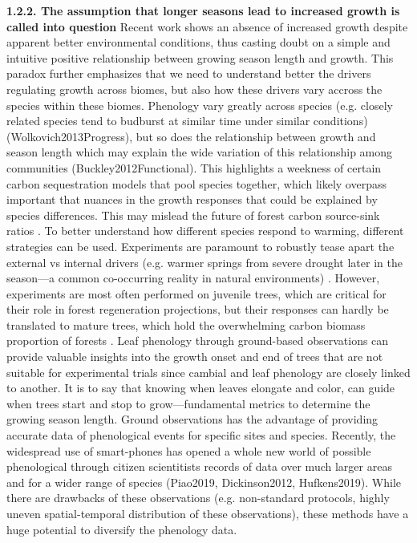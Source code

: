 \documentclass{article}
\begin{document}
\textbf{1.2.2. The assumption that longer seasons lead to increased growth is called into question}
Recent work shows an absence of increased growth despite apparent better environmental conditions, thus casting doubt on a simple and intuitive positive relationship between growing season length and growth. This paradox further emphasizes that we need to understand better the drivers regulating growth across biomes, but also how these drivers vary accross the species within these biomes. Phenology vary greatly across species (e.g. closely related species tend to budburst at similar time under similar conditions) (Wolkovich2013Progress), but so does the relationship between growth and season length which may explain the wide variation of this relationship among communities (Buckley2012Functional). This highlights a weekness of certain carbon sequestration models that pool species together, which likely overpass important that nuances in the growth responses that could be explained by species differences. This may mislead the future of forest carbon source-sink ratios \cite{green_limits_2022,cabon_cross-biome_2022}. To better understand how different species respond to warming, different strategies can be used. Experiments are paramount to robustly tease apart the external vs internal drivers (e.g. warmer springs from severe drought later in the season---a common co-occurring reality in natural environments) \cite{morin_changes_2010,primack_observations_2015}. However, experiments are most often performed on juvenile trees, which are critical for their role in forest regeneration projections, but their responses can hardly be translated to mature trees, which hold the overwhelming carbon biomass proportion of forests \cite{augspurger_differences_2003,silvestro_longer_2023,vitasse_ontogenic_2013}. Leaf phenology through ground-based observations can provide valuable insights into the growth onset and end of trees that are not suitable for experimental trials since cambial and leaf phenology are closely linked to another. It is to say that knowing when leaves elongate and color, can guide when trees start and stop to grow---fundamental metrics to determine the growing season length. Ground observations has the advantage of providing accurate data of phenological events for specific sites and species. Recently, the widespread use of smart-phones has opened a whole new world of possible phenological through citizen scientitists records of data over much larger areas and for a wider range of species (Piao2019, Dickinson2012, Hufkens2019). While there are drawbacks of these observations (e.g. non-standard protocols, highly uneven spatial-temporal distribution of these observations), these methods have a huge potential to diversify the phenology data. %
\end{document}
